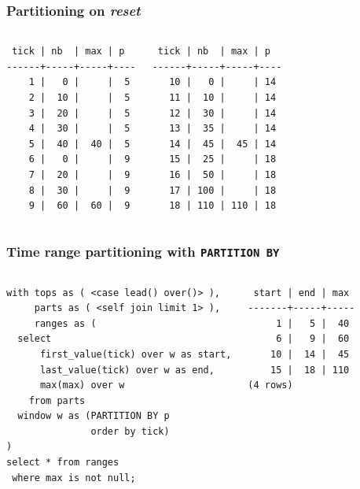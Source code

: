 \documentclass{beamer}
\begin{document}
\begin{frame}[fragile]
  \frametitle{Partitioning on \textit{reset}}

\begin{columns}
\begin{verbatim}
 tick | nb  | max | p  
------+-----+-----+----
    1 |   0 |     |  5
    2 |  10 |     |  5
    3 |  20 |     |  5
    4 |  30 |     |  5
    5 |  40 |  40 |  5
    6 |   0 |     |  9
    7 |  20 |     |  9
    8 |  30 |     |  9
    9 |  60 |  60 |  9
\end{verbatim}

\begin{verbatim}
 tick | nb  | max | p  
------+-----+-----+----
   10 |   0 |     | 14
   11 |  10 |     | 14
   12 |  30 |     | 14
   13 |  35 |     | 14
   14 |  45 |  45 | 14
   15 |  25 |     | 18
   16 |  50 |     | 18
   17 | 100 |     | 18
   18 | 110 | 110 | 18
\end{verbatim}
\end{columns}
\end{frame}

\begin{frame}[fragile]
  \frametitle{Time range partitioning with \texttt{PARTITION BY}}

\begin{columns}
\begin{verbatim}
with tops as ( <case lead() over()> ),
     parts as ( <self join limit 1> ),
     ranges as (
  select
      first_value(tick) over w as start,
      last_value(tick) over w as end,
      max(max) over w
    from parts
  window w as (PARTITION BY p
               order by tick)
)
select * from ranges
 where max is not null;
\end{verbatim}

\begin{verbatim}
 start | end | max 
-------+-----+-----
     1 |   5 |  40
     6 |   9 |  60
    10 |  14 |  45
    15 |  18 | 110
(4 rows)
\end{verbatim}
\end{columns}
\end{frame}
\end{document}
